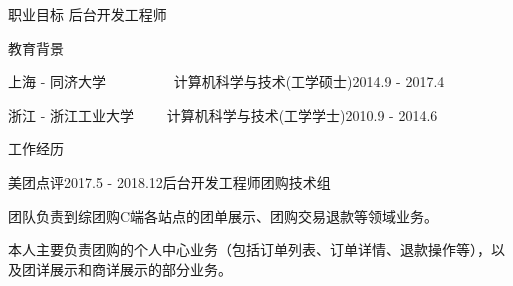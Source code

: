 \documentclass{resume} %
\begin{document}
\begin{rSection}{职业目标}
后台开发工程师
\end{rSection}


\begin{rSection}{教育背景}

\begin{rSubSubsection}{上海 - 同济大学 \ \ \ \ \ \ \ \ \ 计算机科学与技术(工学硕士)}{2014.9 - 2017.4}
\end{rSubSubsection}

\begin{rSubSubsection}{浙江 - 浙江工业大学 \ \ \ \ 计算机科学与技术(工学学士)}{2010.9 - 2014.6}
\end{rSubSubsection}

\end{rSection}


\begin{rSection}{工作经历}

\begin{rSubsection}{美团点评}{2017.5 - 2018.12}{后台开发工程师}{团购技术组}
\item 团队负责到综团购C端各站点的团单展示、团购交易退款等领域业务。
\item 本人主要负责团购的个人中心业务（包括订单列表、订单详情、退款操作等），以及团详展示和商详展示的部分业务。
\end{rSubsection}

\end{rSection}
\end{document}
